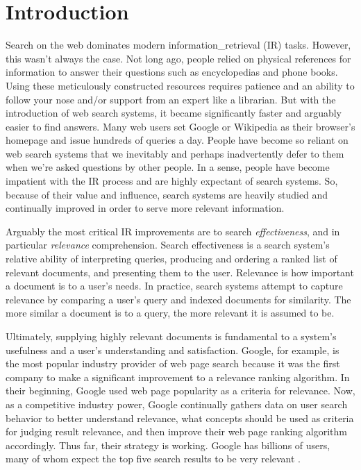 \chapter{Introduction} \label{ch:[chapter 1 label]}

Search on the web dominates modern \gls{information_retrieval} (\acrshort{IR}) tasks. However, this wasn't always the case. Not long ago, people relied on physical references for information to answer their questions such as encyclopedias and phone books. Using these meticulously constructed resources requires patience and an ability to follow your nose and/or support from an expert like a librarian. But with the introduction of web search systems, it became significantly faster and arguably easier to find answers. Many web users set Google or Wikipedia as their browser's homepage and issue hundreds of queries a day. People have become so reliant on web search systems that we inevitably and perhaps inadvertently defer to them when we're asked questions by other people. In a sense, people have become impatient with the IR process and are highly expectant of search systems. So, because of their value and influence, search systems are heavily studied and continually improved in order to serve more relevant information.

Arguably the most critical IR improvements are to search \emph{effectiveness}, and in particular \emph{\gls{relevance}} comprehension. Search effectiveness is a search system's relative ability of interpreting queries, producing and ordering a ranked list of relevant \gls{document}s, and presenting them to the user. Relevance is how important a document is to a user's needs. In practice, search systems attempt to capture relevance by comparing a user's query and indexed documents for similarity. The more similar a document is to a query, the more relevant it is assumed to be.

Ultimately, supplying highly relevant documents is fundamental to a system's usefulness and a user's understanding and satisfaction. Google, for example, is the most popular industry provider of web page search because it was the first company to make a significant improvement to a relevance ranking algorithm. In their beginning, Google used web page popularity as a criteria for relevance. Now, as a competitive industry power, Google continually gathers data on user search behavior to better understand relevance, what concepts should be used as criteria for judging result relevance, and then improve their web page ranking algorithm accordingly. Thus far, their strategy is working. Google has billions of users, many of whom expect the top five search results to be very relevant \cite{Manning2008}.

